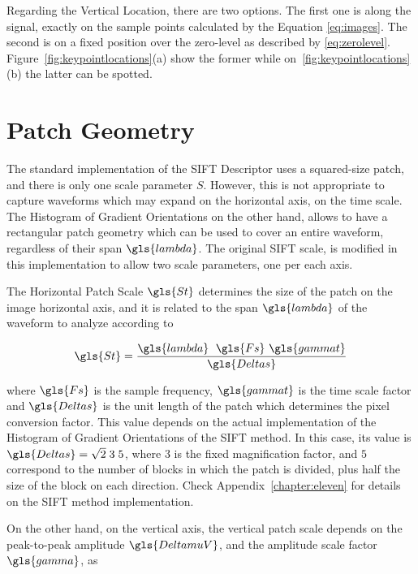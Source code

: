 Regarding the Vertical Location, there are two options.  The first one is along the signal, exactly on the sample points calculated by the Equation \ref{eq:images}.  The second is on a fixed position over the zero-level as described by \ref{eq:zerolevel}.  Figure~\ref{fig:keypointlocations}(a) show the former while on~\ref{fig:keypointlocations}(b) the latter can be spotted.

\section{Patch Geometry}
\label{patchgeometry}


The standard implementation of the SIFT Descriptor uses a squared-size patch, and there is only one scale parameter $S$.  However, this is not appropriate to capture waveforms which may expand on the horizontal axis, on the time scale.  The Histogram of Gradient Orientations on the other hand, allows to have a rectangular patch geometry which can be used to cover an entire waveform, regardless of their span $\gls{lambda}$.  The original SIFT scale, is modified in this implementation to allow two scale parameters, one per each axis.

The Horizontal Patch Scale $\gls{St}$ determines the size of the patch on the image horizontal axis, and it is related to the span $\gls{lambda}$ of the waveform to analyze according to

\begin{equation}
\gls{St} = \frac{ \gls{lambda} \;  \  \gls{Fs} \ \gls{gammat} }{\gls{Deltas}}
\label{eq:horizontalpatchscale}
\end{equation}

\noindent where $\gls{Fs}$ is the sample frequency, $\gls{gammat}$ is the time scale factor and $\gls{Deltas}$ is the unit length of the patch which determines the pixel conversion factor.  This value depends on the actual implementation of the Histogram of Gradient Orientations of the SIFT method. In this case, its value is $\gls{Deltas} = \sqrt{2} \; 3 \; 5$, where $3$ is the fixed magnification factor, and $5$ correspond to the number of blocks in which the patch is divided, plus half the size of the block on each direction.  Check Appendix~\ref{chapter:eleven} for details on the SIFT method implementation.

On the other hand, on the vertical axis, the vertical patch scale depends on the peak-to-peak amplitude $\gls{DeltamuV}$, and the amplitude scale factor $\gls{gamma}$, as

